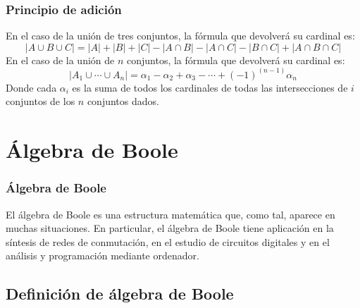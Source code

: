 \documentclass{beamer}
\begin{document}
\begin{frame}
\frametitle{Principio de adici\'on}

En el caso de la uni\'on de tres conjuntos, la f\'ormula que devolver\'a su cardinal es:
\[|A\cup B \cup C| = |A| + |B| + |C| - |A\cap B| - |A\cap C| - |B\cap C| + |A\cap B \cap C|\]
En el caso de la uni\'on de $n$ conjuntos, la f\'ormula que devolver\'a su cardinal es:
\[|A_1\cup \cdots \cup A_n| = \alpha_1-\alpha_2+\alpha_3-\cdots + (-1)^(n-1)\alpha_n\]
Donde cada $\alpha_i$ es la suma de todos los cardinales de todas las intersecciones de $i$ conjuntos de los $n$ conjuntos dados. 
\end{frame}

\section{\'Algebra de Boole}

\begin{frame}
\frametitle{\'Algebra de Boole}
El \'algebra de Boole es una estructura matem\'atica que, como tal, aparece en muchas situaciones. En particular, el \'algebra de Boole tiene aplicaci\'on en la s\'intesis de redes de conmutaci\'on, en el estudio de circuitos digitales y en el an\'alisis y programaci\'on mediante ordenador.
\end{frame}

\subsection{Definici\'on de \'algebra de Boole}
\end{document}
